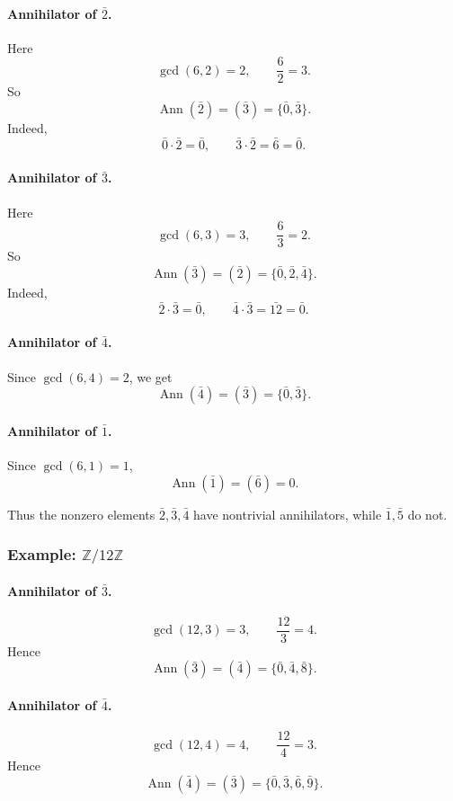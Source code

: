 \documentclass[12pt,a4paper,oneside]{report}
\DeclareMathOperator{\Ann}{Ann}
\theoremstyle{notespace}
\begin{document}
	\paragraph{Annihilator of \(\bar 2\).}
	Here
	\[
	\gcd(6,2)=2,
	\qquad
	\frac{6}{2}=3.
	\]
	So
	\[
	\Ann(\bar 2)=(\bar 3)=\{\bar 0,\bar 3\}.
	\]
	Indeed,
	\[
	\bar 0\cdot \bar 2=\bar 0,\qquad \bar 3\cdot \bar 2=\bar 6=\bar 0.
	\]
	
	\paragraph{Annihilator of \(\bar 3\).}
	Here
	\[
	\gcd(6,3)=3,
	\qquad
	\frac{6}{3}=2.
	\]
	So
	\[
	\Ann(\bar 3)=(\bar 2)=\{\bar 0,\bar 2,\bar 4\}.
	\]
	Indeed,
	\[
	\bar 2\cdot \bar 3=\bar 0,\qquad
	\bar 4\cdot \bar 3=\bar{12}=\bar 0.
	\]
	
	\paragraph{Annihilator of \(\bar 4\).}
	Since \(\gcd(6,4)=2\), we get
	\[
	\Ann(\bar 4)=(\bar 3)=\{\bar 0,\bar 3\}.
	\]
	
	\paragraph{Annihilator of \(\bar 1\).}
	Since \(\gcd(6,1)=1\),
	\[
	\Ann(\bar 1)=(\bar 6)=0.
	\]
	
	Thus the nonzero elements \(\bar 2,\bar 3,\bar 4\) have nontrivial annihilators, while \(\bar 1,\bar 5\) do not.
	
	\subsubsection{Example: \(\mathbb Z/12\mathbb Z\)}
	
	\paragraph{Annihilator of \(\bar 3\).}
	\[
	\gcd(12,3)=3,\qquad \frac{12}{3}=4.
	\]
	Hence
	\[
	\Ann(\bar 3)=(\bar 4)=\{\bar 0,\bar 4,\bar 8\}.
	\]
	
	\paragraph{Annihilator of \(\bar 4\).}
	\[
	\gcd(12,4)=4,\qquad \frac{12}{4}=3.
	\]
	Hence
	\[
	\Ann(\bar 4)=(\bar 3)=\{\bar 0,\bar 3,\bar 6,\bar 9\}.
	\]
	
\end{document}
